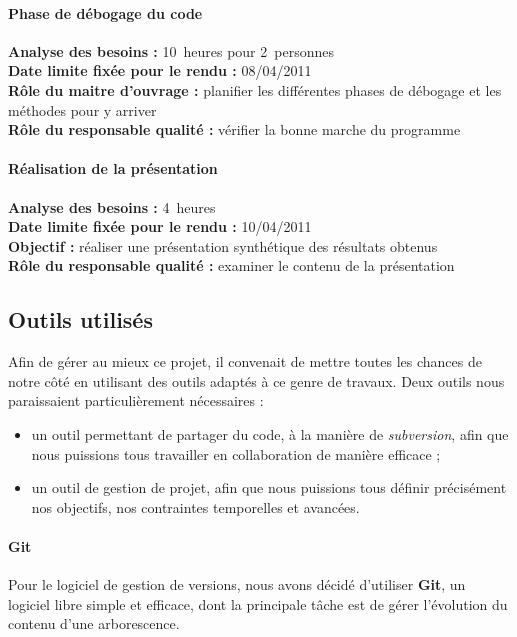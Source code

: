 \paragraph*{Phase de débogage du code\\}
\textbf{Analyse des besoins :} 10~heures pour 2~personnes\\
\textbf{Date limite fixée pour le rendu :} 08/04/2011\\
\textbf{Rôle du maitre d'ouvrage :} planifier les différentes phases de débogage et les méthodes pour y arriver\\
\textbf{Rôle du responsable qualité :} vérifier la bonne marche du programme

\paragraph*{Réalisation de la présentation}
\textbf{Analyse des besoins : }4~heures\\
\textbf{Date limite fixée pour le rendu : }10/04/2011\\
\textbf{Objectif : }réaliser une présentation synthétique des résultats obtenus\\
\textbf{Rôle du responsable qualité : } examiner le contenu de la présentation


\subsection{Outils utilisés}
Afin de gérer au mieux ce projet, il convenait de mettre toutes les chances de notre côté en utilisant des outils adaptés à ce genre de travaux. Deux outils nous paraissaient particulièrement nécessaires :
\begin{itemize}
  \item un outil permettant de partager du code, à la manière de \textit{subversion}, afin que nous puissions tous travailler en collaboration de manière efficace ;
  \item un outil de gestion de projet, afin que nous puissions tous définir précisément nos objectifs, nos contraintes temporelles et avancées.
\end{itemize}

\paragraph*{Git\\}

Pour le logiciel de gestion de versions, nous avons décidé d'utiliser \textbf{Git}, un logiciel libre simple et efficace, dont la principale tâche est de gérer l'évolution du contenu d'une arborescence.

